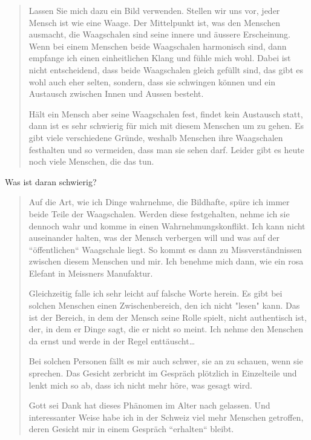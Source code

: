 \documentclass[10pt,titlepage,a5paper]{book}
\newenvironment{tg}{\begin{quote}\em}{\end{quote}}
\begin{document}
\begin{tg}

Lassen Sie mich dazu ein Bild verwenden. Stellen wir uns vor, jeder Mensch ist wie eine Waage. Der Mittelpunkt ist, was den Menschen ausmacht, die Waagschalen sind seine innere und äussere Erscheinung. Wenn bei einem Menschen beide Waagschalen harmonisch sind, dann empfange ich einen einheitlichen Klang und fühle mich wohl. Dabei ist nicht entscheidend, dass beide Waagschalen gleich gefüllt sind, das gibt es wohl auch eher selten, sondern, dass sie schwingen können und ein Austausch zwischen Innen und Aussen besteht.

Hält ein Mensch aber seine Waagschalen fest, findet kein Austausch statt, dann ist es sehr schwierig für mich mit diesem Menschen um zu gehen. Es gibt viele verschiedene Gründe, weshalb Menschen ihre Waagschalen festhalten und so vermeiden, dass man sie sehen darf. Leider gibt es heute noch viele Menschen, die das tun.

\end{tg}
 
 Was ist daran schwierig?
 
 \begin{tg}
 
 Auf die Art, wie ich Dinge wahrnehme, die Bildhafte, spüre ich immer beide Teile der Waagschalen. Werden diese festgehalten, nehme ich sie dennoch wahr und komme in einen Wahrnehmungskonflikt. Ich kann nicht auseinander halten, was der Mensch verbergen will und was auf der ``öffentlichen`` Waagschale liegt. So kommt es dann zu Missverständnissen zwischen diesem Menschen und mir. Ich benehme mich dann, wie ein rosa Elefant in Meissners Manufaktur.
 
 Gleichzeitig falle ich sehr leicht auf falsche Worte herein. Es gibt bei solchen Menschen einen Zwischenbereich, den ich nicht "lesen"{} kann. Das ist der Bereich, in dem der Mensch seine Rolle spielt, nicht authentisch ist, der, in dem er Dinge sagt, die er nicht so meint. Ich nehme den Menschen da ernst und werde in der Regel enttäuscht\dots 
 
 Bei solchen Personen fällt es mir auch schwer, sie an zu schauen, wenn sie sprechen. Das Gesicht zerbricht im Gespräch plötzlich in Einzelteile und lenkt mich so ab, dass ich nicht mehr höre, was gesagt wird.
 
  Gott sei Dank hat dieses Phänomen im Alter nach gelassen. Und interessanter Weise habe ich in der Schweiz viel mehr Menschen getroffen, deren Gesicht mir in einem Gespräch ``erhalten`` bleibt. 
 


\end{tg}
\end{document}
